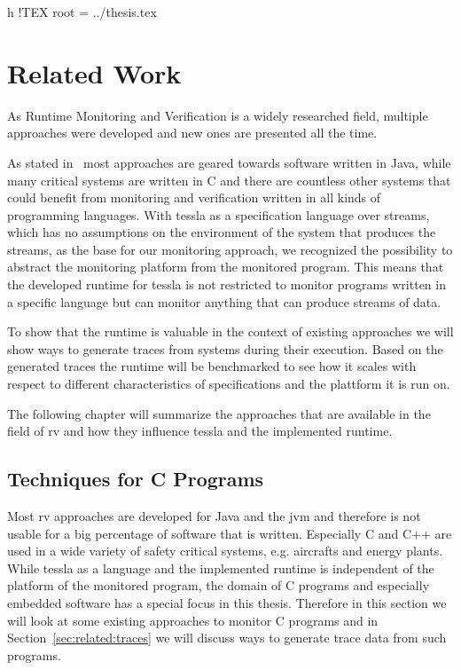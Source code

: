 h !TEX root = ../thesis.tex
%
\chapter{Related Work}
\label{sec:related}

As Runtime Monitoring and Verification is a widely researched field, multiple approaches were developed and new ones are presented all the time.

As stated in~\cite{Havelund2008} most approaches are geared towards software written in Java, while many critical systems are written in C and there are countless other systems that could benefit from monitoring and verification written in all kinds of programming languages.
With \gls{tessla} as a specification language over streams, which has no assumptions on the environment of the system that produces the streams,  as the base for our monitoring approach, we recognized the possibility to abstract the monitoring platform from the monitored program.
This means that the developed runtime for \gls{tessla} is not restricted to monitor programs written in a specific language but can monitor anything that can produce streams of data.

To show that the runtime is valuable in the context of existing approaches we will show ways to generate traces from systems during their execution.
Based on the generated traces the runtime will be benchmarked to see how it scales with respect to different characteristics of specifications and the plattform it is run on.

The following chapter will summarize the approaches that are available in the field of \gls{rv} and how they influence \gls{tessla} and the implemented runtime.

\section{ Techniques for C Programs}
\label{sec:related:c_programs}

Most \gls{rv} approaches are developed for Java and the \gls{jvm} and therefore is not usable for a big percentage of software that is written.
Especially C and C++ are used in a wide variety of safety critical systems, e.g. aircrafts and energy plants.
While \gls{tessla} as a language and the implemented runtime is independent of the platform of the monitored program, the domain of C programs and especially embedded software has a special focus in this thesis.
Therefore in this section we will look at some existing approaches to monitor C programs and in Section~\ref{sec:related:traces} we will discuss ways to generate trace data from such programs.

